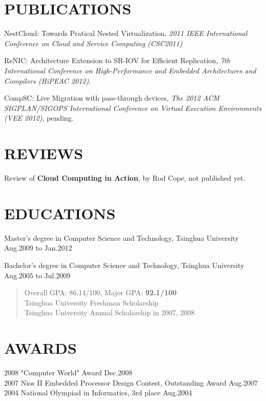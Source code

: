 \documentclass[11pt]{res} %
\begin{document}
\begin{resume}


\section{PUBLICATIONS}
NestCloud: Towards Pratical Nested Virtualization, \emph{2011 IEEE
  International Conference on Cloud and Service Computing (CSC2011)}

ReNIC: Architecture Extension to SR-IOV for Efficient Replication,
\emph{7th International Conference on High-Performance and Embedded
  Architectures and Compilers (HiPEAC 2012)}.

CompSC: Live Migration with pass-through devices, \emph{The 2012 ACM
  SIGPLAN/SIGOPS International Conference on Virtual Execution
  Environments (VEE 2012)}, pending.

\section{REVIEWS}
Review of \textbf{Cloud Computing in Action}, by Rod Cope, not published yet.

\section{EDUCATIONS}
Master's degree in Computer Science and Technology, Tsinghua University \\
\hspace*{\fill} Aug.2009 to Jan.2012

Bachelor's degree in Computer Science and Technology, Tsinghua University \\
\hspace*{\fill} Aug.2005 to Jul.2009
\begin{quote}
Overall GPA: 86.14/100, Major GPA: \textbf{92.1/100} \\
Tsinghua University Freshman Scholarship \\
Tsinghua University Annual Scholarship in 2007, 2008 \\
\end{quote}

\section{AWARDS}
2008 "Computer World" Award \hfill Dec.2008 \\
2007 Nios II Embedded Processor Design Contest, Outstanding Award \hfill Aug.2007 \\
2004 National Olympiad in Informatics, 3rd place \hfill Aug.2004

\end{resume}
\end{document}
